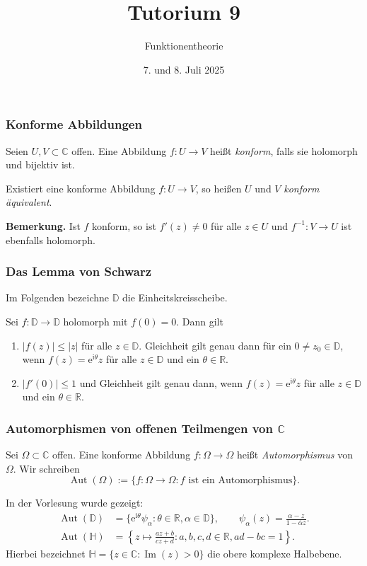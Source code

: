 \documentclass[10pt]{beamer}
\author[\url{https://fdf-uni.github.io/ft}]{}
\title{Tutorium 9}
\subtitle{\texorpdfstring{Funktionentheorie\vspace*{-1.5cm}}{Funktionentheorie}}
\date{7. und 8. Juli 2025}
\newcommand{\iu}{\mathrm{i}}
\renewcommand{\Im}{\operatorname{Im}}
\begin{document}
\begin{frame}
	\titlepage
\end{frame}
\begin{frame}
	\frametitle{Konforme Abbildungen}
	\begin{definition}
		Seien $U, V \subset \mathbb{C}$ offen.
		Eine Abbildung $f \colon U \to V$ heißt \emph{konform}, falls sie holomorph und bijektiv ist.

		\pause
		Existiert eine konforme Abbildung $f \colon U \to V$, so heißen $U$ und $V$ \emph{konform äquivalent}.
	\end{definition}
	\pause
	\textbf{Bemerkung.} Ist $f$ konform, so ist $f'(z) \neq 0$ für alle $z \in U$ und $f^{-1} \colon V \to U$ ist ebenfalls holomorph.
\end{frame}
\begin{frame}
	\frametitle{Das Lemma von Schwarz}
	\pause
	Im Folgenden bezeichne $\mathbb{D}$ die Einheitskreisscheibe.
	\pause
	\begin{lemma}
		Sei $f \colon \mathbb{D} \to \mathbb{D}$ holomorph mit $f(0) = 0$.
		Dann gilt
		\pause
		\begin{enumerate}
			\item $\lvert f(z) \rvert \le \lvert z \rvert$ für alle $z \in \mathbb{D}$.
			      Gleichheit gilt genau dann für ein $0 \neq z_0 \in \mathbb{D}$, wenn $f(z) = \mathrm{e}^{\iu \theta} z$ für alle $z \in \mathbb{D}$ und ein $\theta \in \mathbb{R}$.
			      \pause
			\item $\lvert f'(0) \rvert \le 1$ und Gleichheit gilt genau dann, wenn $f(z) = \mathrm{e}^{\mathrm{i} \theta} z$ für alle $z \in \mathbb{D}$ und ein $\theta \in \mathbb{R}$.
		\end{enumerate}
	\end{lemma}
\end{frame}
\begin{frame}
	\frametitle{Automorphismen von offenen Teilmengen von $\mathbb{C}$}
	\pause
	\begin{definition}
		Sei $\Omega \subset \mathbb{C}$ offen.
		Eine konforme Abbildung $f \colon \Omega \to \Omega$ heißt \emph{Automorphismus} von $\Omega$.
		Wir schreiben
		\[
			\operatorname{Aut}(\Omega) := \{f \colon \Omega \to \Omega : f \text{ ist ein Automorphismus} \}.
		\]
	\end{definition}
	\pause
	In der Vorlesung wurde gezeigt:
	\pause
	\begin{align*}
		\operatorname{Aut}(\mathbb{D}) & = \{\mathrm{e}^{\iu \theta} \psi_{\alpha} : \theta \in \mathbb{R}, \alpha \in \mathbb{D} \}, \qquad \psi_{\alpha}(z) = \frac{\alpha - z}{1 - \overline{\alpha} z}. \\
		\operatorname{Aut}(\mathbb{H}) & = \left\{ z \mapsto \frac{a z + b}{c z + d} : a, b, c, d \in \mathbb{R}, ad - bc = 1 \right\}.
	\end{align*}
	Hierbei bezeichnet $\mathbb{H} = \{z \in \mathbb{C} : \Im(z) > 0 \}$ die obere komplexe Halbebene.
\end{frame}
\end{document}

